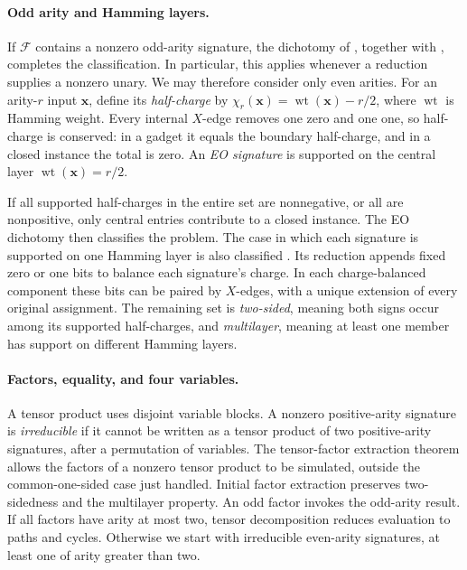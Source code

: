 \documentclass[11pt,letterpaper,onecolumn]{article}
\theoremstyle{plain}
\theoremstyle{definition}
\theoremstyle{remark}
\newcommand{\cF}{\mathcal F}
\newcommand{\wt}{\operatorname{wt}}
\begin{document}
\paragraph{Odd arity and Hamming layers.}
If \(\cF\) contains a nonzero odd-arity signature, the dichotomy of
\cite{MengWangXiaZheng2025}, together with \cite{GuanShaoShi2026}, completes
the classification. In particular, this applies whenever a reduction
supplies a nonzero unary. We may therefore consider only even arities.
For an arity-\(r\) input \(\mathbf x\), define its \emph{half-charge} by
\(\chi_r(\mathbf x)=\wt(\mathbf x)-r/2\), where \(\wt\) is Hamming weight.
Every internal \(X\)-edge removes one zero and one one, so half-charge is
conserved: in a gadget it equals the boundary half-charge, and in a closed
instance the total is zero. An \emph{EO signature} is supported on the
central layer \(\wt(\mathbf x)=r/2\).

If all supported half-charges in the entire set are nonnegative, or all
are nonpositive, only central entries contribute to a closed instance.
The EO dichotomy \cite{MengWangXia2025EO,GuanShaoShi2026} then classifies
the problem. The case in which each signature is supported on one Hamming
layer is also classified \cite[Corollary~68]{MengWangXia2025EO}.
Its reduction appends fixed zero or one bits to balance each signature's
charge. In each charge-balanced component these bits can be paired by
\(X\)-edges, with a unique extension of every original assignment.
The remaining set is \emph{two-sided}, meaning both signs occur among
its supported half-charges, and \emph{multilayer}, meaning at least one
member has support on different Hamming layers.

\paragraph{Factors, equality, and four variables.}
A tensor product uses disjoint variable blocks. A nonzero positive-arity
signature is \emph{irreducible} if it cannot be written as a tensor product
of two positive-arity signatures, after a permutation of variables.
The tensor-factor extraction theorem
\cite[full version, Theorem~32 and Remark~39]{MengWangXiaZheng2025}
allows the factors of a nonzero tensor product to be simulated,
outside the common-one-sided case just handled. Initial factor
extraction preserves two-sidedness and the multilayer property. An odd
factor invokes the odd-arity result. If all factors have arity at most
two, tensor decomposition reduces evaluation to paths and cycles.
Otherwise we start with irreducible even-arity signatures, at least one
of arity greater than two.
\end{document}
